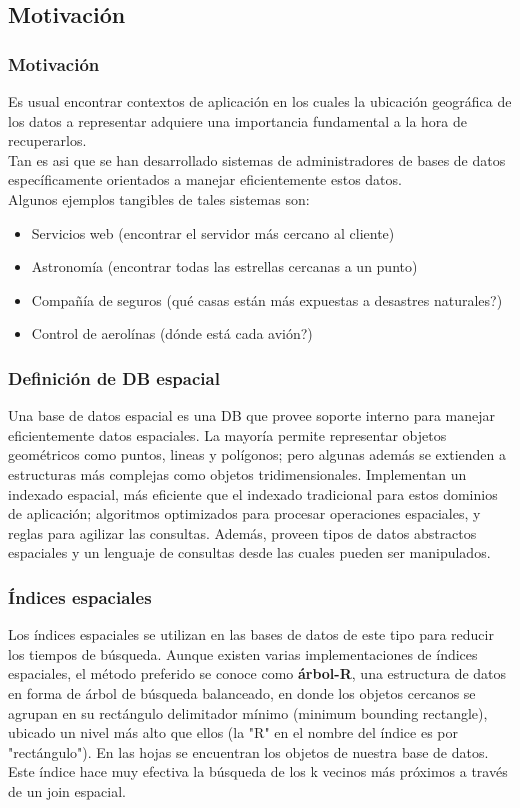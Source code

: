 
\subsection{Motivación}

\begin{frame}
		\frametitle{Motivación}
		Es usual encontrar contextos de aplicación en los cuales la ubicación geográfica de los datos a representar adquiere una importancia fundamental a la hora de recuperarlos. \pause \\
		Tan es asi que se han desarrollado sistemas de administradores de bases de datos específicamente orientados a manejar eficientemente estos datos. \pause \\
		Algunos ejemplos tangibles de tales sistemas son:
		\begin{itemize}
				\item	Servicios web (encontrar el servidor más cercano al cliente) \pause
				\item	Astronomía (encontrar todas las estrellas cercanas a un punto) \pause
				\item	Compañía de seguros (qué casas están más expuestas a desastres naturales?) \pause
				\item	Control de aerolínas (dónde está cada avión?)
		\end{itemize}
\end{frame}

\begin{frame}
		\frametitle{Definición de DB espacial}
		Una base de datos espacial es una DB que provee soporte interno para manejar eficientemente datos espaciales. \pause
		La mayoría permite representar objetos geométricos como puntos, lineas y polígonos; pero algunas además se extienden a estructuras más complejas como objetos tridimensionales. \pause
		Implementan un indexado espacial, más eficiente que el indexado tradicional para estos dominios de aplicación; algoritmos optimizados para procesar operaciones espaciales, y reglas para agilizar las consultas. \pause
		Además, proveen tipos de datos abstractos espaciales y un lenguaje de consultas desde las cuales pueden ser manipulados.
\end{frame}

\begin{frame}
		\frametitle{Índices espaciales}
		Los índices espaciales se utilizan en las bases de datos de este tipo para reducir los tiempos de búsqueda. \pause
		Aunque existen varias implementaciones de índices espaciales, el método preferido se conoce como {\bf árbol-R}, una estructura de datos en forma de árbol de búsqueda balanceado, en donde los objetos cercanos se agrupan en su rectángulo delimitador mínimo (minimum bounding rectangle), ubicado un nivel más alto que ellos (la "R" en el nombre del índice es por "rectángulo"). \pause
		En las hojas se encuentran los objetos de nuestra base de datos. \pause
		Este índice hace muy efectiva la búsqueda de los k vecinos más próximos a través de un join espacial.
\end{frame}

